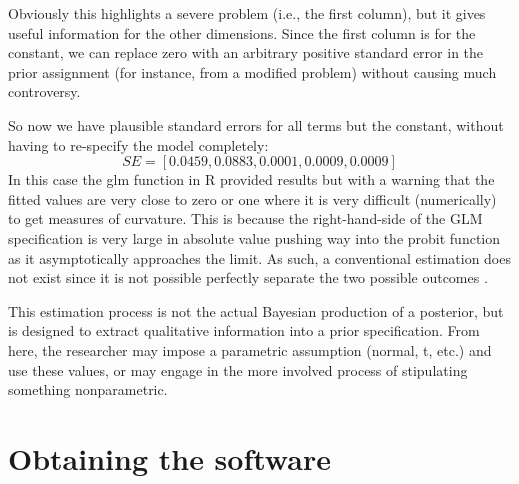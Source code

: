 \documentclass[11pt]{article}
\begin{document}
Obviously this highlights a severe problem (i.e., the first column), but it gives useful
information for the other dimensions. Since the first column is for the constant, we can
replace zero with an arbitrary positive standard error in the prior assignment (for instance,
from a modified problem) without causing much controversy. 

So now we have plausible standard errors for all terms but the constant, without having to 
re-specify the model completely:
\begin{equation}
  SE = [0.0459, 0.0883, 0.0001, 0.0009, 0.0009]
\end{equation}
 In this case the glm function in R 
provided results but with a warning that the fitted values are very close
to zero or one where it is very difficult (numerically) to get measures
of curvature. This is because the right-hand-side of the GLM 
specification is very large in absolute value pushing way into the probit
function as it asymptotically approaches the limit. As such, a 
conventional estimation does not exist since it is not possible perfectly
separate the two possible outcomes \citep{VenRip02}.

This estimation
process is not the actual Bayesian production of a posterior, but is designed to extract
qualitative information into a prior specification. From here, the researcher may impose
a parametric assumption (normal, t, etc.) and use these values, or may engage in the more
involved process of stipulating something nonparametric.


\section{Obtaining the software}
\end{document}
